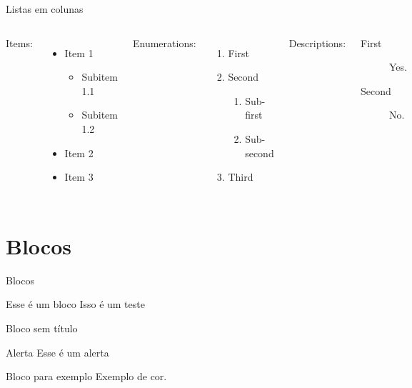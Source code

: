 \documentclass{beamer}
\begin{document}
\begin{frame}[wide]{Listas em colunas}
    \begin{columns}[t, onlytextwidth]
            Items:
            \begin{itemize}
                \item Item 1
                \begin{itemize}
                    \item Subitem 1.1
                    \item Subitem 1.2
                \end{itemize}
                \item Item 2
                \item Item 3
            \end{itemize}
        
            Enumerations:
            \begin{enumerate}
                \item First
                \item Second
                \begin{enumerate}
                    \item Sub-first
                    \item Sub-second
                \end{enumerate}
                \item Third
            \end{enumerate}
        
            Descriptions:
            \begin{description}
                \item[First] Yes.
                \item[Second] No.
            \end{description}
    \end{columns}
\end{frame}


\section{Blocos}


\begin{frame}{Blocos}
	\begin{block}{Esse é um bloco}
		Isso é um teste
	\end{block}
	\begin{block}{}
	Bloco sem título	
	\end{block}
	\begin{alertblock}{Alerta}
		Esse é um alerta
	\end{alertblock}
	\begin{exampleblock}{Bloco para exemplo}
            Exemplo de \textcolor{example}{cor}.
        \end{exampleblock}
\end{frame}
\end{document}
